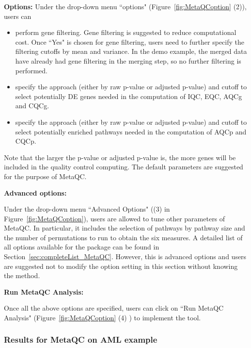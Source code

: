 \begin{steps}
\item \textbf{Options:}
Under the drop-down menu ``options" (Figure~\ref{fig:MetaQCoption} {\color{red}(2)}),
users can 

\begin{itemize}
\item perform gene filtering. Gene filtering is suggested to reduce computational cost. Once ``Yes" is chosen for gene filtering, 
users need to further specify the filtering cutoffs by mean and variance. 
In the demo example, 
the merged data have already had gene filtering in the merging step, so no further filtering is performed. 
\item specify the approach (either by raw p-value or adjusted p-value) and cutoff to select potentially DE genes needed in the computation of IQC, EQC, AQCg and CQCg.
\item specify the approach (either by raw p-value or adjusted p-value) and cutoff to select potentially enriched pathways needed in the computation of AQCp and CQCp.
\end{itemize}
Note that the larger the p-value or adjusted p-value is, 
the more genes will be included in the quality control computing.
The default parameters are suggested for the purpose of MetaQC.

\item \textbf{Advanced options:}



Under the drop-down menu ``Advanced Options" ({\color{red}(3)} in Figure~\ref{fig:MetaQCoption}), users are allowed to tune other parameters of MetaQC.
In particular, it includes the selection of pathways by pathway size and the number of permutations to run to obtain the six measures. 
A detailed list of all options available for the package can be found in Section~\ref{sec:completeList_MetaQC}. 
However, this is advanced options and users are suggested not to modify the option setting in this section without knowing the method. 

\item \textbf{Run MetaQC Analysis:}

Once all the above options are specified, users can click on ``Run MetaQC Analysis" (Figure~\ref{fig:MetaQCoption}  {\color{red}(4)}  ) to implement the tool. 

\end{steps}



\subsubsection{Results for MetaQC on AML example}

